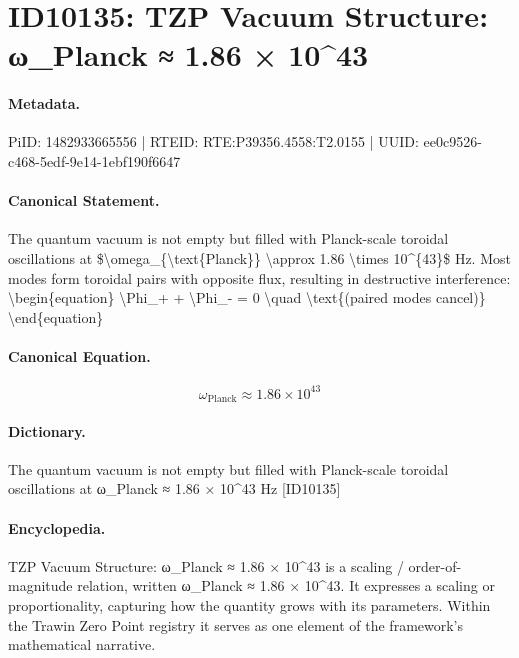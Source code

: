\section*{ID10135: TZP Vacuum Structure: ω\_Planck ≈ 1.86 × 10\textasciicircum{}43}
\paragraph{Metadata.}
PiID: 1482933665556 | RTEID: RTE:P39356.4558:T2.0155 | UUID: ee0c9526-c468-5edf-9e14-1ebf190f6647

\paragraph{Canonical Statement.}
The quantum vacuum is not empty but filled with Planck-scale toroidal oscillations at \$\textbackslash{}omega\_\{\textbackslash{}text\{Planck\}\} \textbackslash{}approx 1.86 \textbackslash{}times 10\textasciicircum{}\{43\}\$ Hz. Most modes form toroidal pairs with opposite flux, resulting in destructive interference: \textbackslash{}begin\{equation\} \textbackslash{}Phi\_+ + \textbackslash{}Phi\_- = 0 \textbackslash{}quad \textbackslash{}text\{(paired modes cancel)\} \textbackslash{}end\{equation\}

\paragraph{Canonical Equation.}
\[
\omega_{\text{Planck}} \approx 1.86 \times 10^{43}
\]

\paragraph{Dictionary.}
The quantum vacuum is not empty but filled with Planck-scale toroidal oscillations at ω\_Planck ≈ 1.86 × 10\textasciicircum{}43 Hz [ID10135]

\paragraph{Encyclopedia.}
TZP Vacuum Structure: ω\_Planck ≈ 1.86 × 10\textasciicircum{}43 is a scaling / order-of-magnitude relation, written ω\_Planck ≈ 1.86 × 10\textasciicircum{}43. It expresses a scaling or proportionality, capturing how the quantity grows with its parameters. Within the Trawin Zero Point registry it serves as one element of the framework's mathematical narrative.
